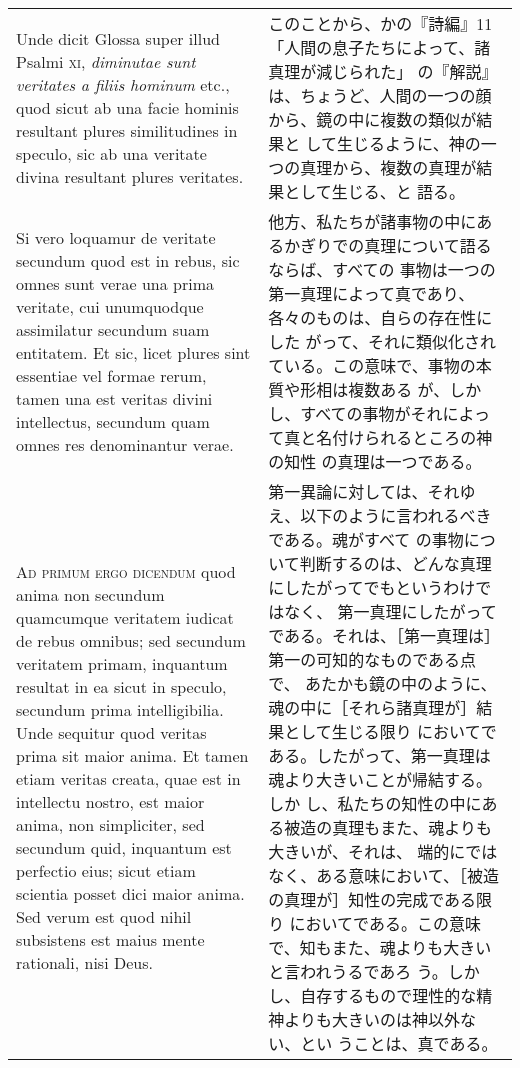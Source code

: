 \documentclass[10pt]{jsarticle} %
\begin{document}
\begin{longtable}{p{21em}p{21em}}
\\



Unde dicit Glossa super illud Psalmi {\scshape xi},
{\itshape diminutae sunt veritates a filiis hominum} etc., quod sicut ab una facie
hominis resultant plures similitudines in speculo, sic ab una veritate
divina resultant plures veritates. 




&

このことから、かの『詩編』11「人間の息子たちによって、諸真理が減じられた」
 の『解説』は、ちょうど、人間の一つの顔から、鏡の中に複数の類似が結果と
 して生じるように、神の一つの真理から、複数の真理が結果として生じる、と
 語る。

\\


Si vero loquamur de veritate secundum
quod est in rebus, sic omnes sunt verae una prima veritate, cui
unumquodque assimilatur secundum suam entitatem. Et sic, licet plures
sint essentiae vel formae rerum, tamen una est veritas divini
intellectus, secundum quam omnes res denominantur verae.

&

他方、私たちが諸事物の中にあるかぎりでの真理について語るならば、すべての
 事物は一つの第一真理によって真であり、各々のものは、自らの存在性にした
 がって、それに類似化されている。この意味で、事物の本質や形相は複数ある
 が、しかし、すべての事物がそれによって真と名付けられるところの神の知性
 の真理は一つである。


\\



{\scshape Ad primum ergo dicendum} quod anima
non secundum quamcumque veritatem iudicat de rebus omnibus; sed secundum
veritatem primam, inquantum resultat in ea sicut in speculo, secundum
prima intelligibilia. Unde sequitur quod veritas prima sit maior
anima. Et tamen etiam veritas creata, quae est in intellectu nostro, est
maior anima, non simpliciter, sed secundum quid, inquantum est perfectio
eius; sicut etiam scientia posset dici maior anima. Sed verum est quod
nihil subsistens est maius mente rationali, nisi Deus.


&

第一異論に対しては、それゆえ、以下のように言われるべきである。魂がすべて
の事物について判断するのは、どんな真理にしたがってでもというわけではなく、
第一真理にしたがってである。それは、［第一真理は］第一の可知的なものである点で、
 あたかも鏡の中のように、魂の中に［それら諸真理が］結果として生じる限り
 においてである。したがって、第一真理は魂より大きいことが帰結する。しか
 し、私たちの知性の中にある被造の真理もまた、魂よりも大きいが、それは、
 端的にではなく、ある意味において、［被造の真理が］知性の完成である限り
 においてである。この意味で、知もまた、魂よりも大きいと言われうるであろ
 う。しかし、自存するもので理性的な精神よりも大きいのは神以外ない、とい
 うことは、真である。


\end{longtable}
\end{document}
